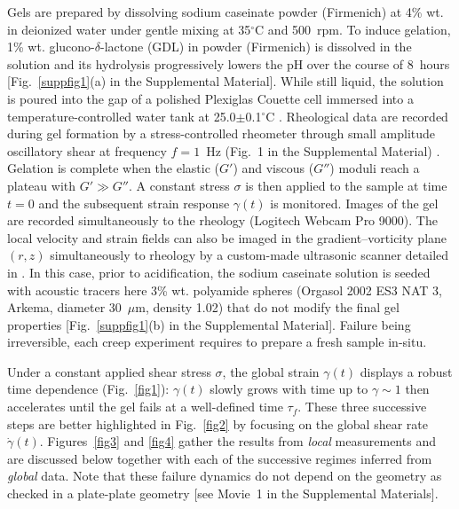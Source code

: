\documentclass[twocolumn,superscriptaddress,showpacs,preprintnumbers,amsmath,amssymb,prl]{revtex4}
\newcommand\gp{\dot\gamma}
\begin{document}
Gels are prepared by dissolving sodium caseinate powder (Firmenich) at 4\% wt. in deionized water under gentle mixing at 35$^{\circ}$C and 500~rpm. To induce gelation, 1\% wt. glucono-$\delta$-lactone (GDL) in powder (Firmenich) is dissolved in the solution and its hydrolysis progressively lowers the pH over the course of 8~hours [Fig.~\ref{suppfig1}(a) in the Supplemental Material]. While still liquid, the solution is poured into the gap of a polished Plexiglas Couette cell immersed into a temperature-controlled water tank at 25.0$\pm$0.1$^{\circ}$C \cite{note}. Rheological data are recorded during gel formation by a stress-controlled rheometer through small amplitude oscillatory shear at frequency $f=1$~Hz (Fig.~1 in the Supplemental Material) \cite{note}. Gelation is complete when the elastic ($G'$) and viscous ($G''$) moduli reach a plateau with $G'\gg G''$. A constant stress $\sigma$ is then applied to the sample at time $t=0$ and the subsequent strain response $\gamma(t)$ is monitored. Images of the gel are recorded simultaneously to the rheology (Logitech Webcam Pro 9000). The local velocity and strain fields can also be imaged in the gradient--vorticity plane $(r,z)$ simultaneously to rheology by a custom-made ultrasonic scanner detailed in \cite{Gallot:2013}. In this case, prior to acidification, the sodium caseinate solution is seeded with acoustic tracers here 3\% wt. polyamide spheres (Orgasol 2002 ES3 NAT 3, Arkema, diameter 30~$\mu$m, density 1.02) that do not modify the final gel properties [Fig.~\ref{suppfig1}(b) in the Supplemental Material]. Failure being irreversible, each creep experiment requires to prepare a fresh sample in-situ.  

Under a constant applied shear stress $\sigma$, the global strain $\gamma(t)$ displays a robust time dependence (Fig.~\ref{fig1}): $\gamma(t)$ slowly grows with time up to $\gamma \sim 1$ then accelerates until the gel fails at a well-defined time $\tau_f$. These three successive steps are better highlighted in Fig.~\ref{fig2} by focusing on the global shear rate $\gp(t)$. Figures~\ref{fig3} and \ref{fig4} gather the results from {\it local} measurements and are discussed below together with each of the successive regimes inferred from {\it global} data. Note that these failure dynamics do not depend on the geometry as checked in a plate-plate geometry [see Movie~1 in the Supplemental Materials].
\end{document}
